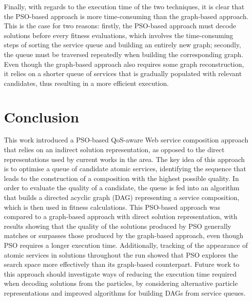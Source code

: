 \documentclass{llncs}
\begin{document}
Finally, with regards to the execution time of the two techniques, it is clear that the PSO-based approach is more time-consuming than the graph-based approach. This is the case for two reasons: firstly, the PSO-based approach must decode solutions before every fitness evaluations, which involves the time-consuming steps of sorting the service queue and building an entirely new graph; secondly, the queue must be traversed repeatedly when building the corresponding graph. Even though the graph-based approach also requires some graph reconstruction, it relies on a shorter queue of services that is gradually populated with relevant candidates, thus resulting in a more efficient execution.

\section{Conclusion}\label{conclusion}

This work introduced a PSO-based QoS-aware Web service composition approach that relies on an indirect solution representation, as opposed to the direct representations used by current works in the area. The key idea of this approach is to optimise a queue of candidate atomic services, identifying the sequence that leads to the construction of a composition with the highest possible quality. In order to evaluate the quality of a candidate, the queue is fed into an algorithm that builds a directed acyclic graph (DAG) representing a service composition, which is then used in fitness calculations. This PSO-based approach was compared to a graph-based approach with direct solution representation, with results showing that the quality of the solutions produced by PSO generally matches or surpasses those produced by the graph-based approach, even though PSO requires a longer execution time. Additionally, tracking of the appearance of atomic services in solutions throughout the run showed that PSO explores the search space more effectively than its graph-based counterpart. Future work to this approach should investigate ways of reducing the execution time required when decoding solutions from the particles, by considering alternative particle representations and improved algorithms for building DAGs from service queues.



\end{document}
